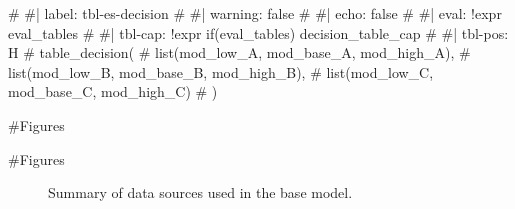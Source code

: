 \documentclass[
]{scrartcl}
\newenvironment{Shaded}{\begin{snugshade}}{\end{snugshade}}
\newcommand{\CommentTok}[1]{\textcolor[rgb]{0.37,0.37,0.37}{#1}}
\begin{document}
\begin{landscape}
\begin{longtable}
\end{longtable}

\endgroup

\end{landscape}

\begin{Shaded}
\begin{Highlighting}[]
\CommentTok{\# \#| label: tbl{-}es{-}decision}
\CommentTok{\# \#| warning: false}
\CommentTok{\# \#| echo: false}
\CommentTok{\# \#| eval: !expr eval\_tables }
\CommentTok{\# \#| tbl{-}cap: !expr if(eval\_tables) decision\_table\_cap }
\CommentTok{\# \#| tbl{-}pos: H}
\CommentTok{\# table\_decision(}
\CommentTok{\#   list(mod\_low\_A, mod\_base\_A, mod\_high\_A),}
\CommentTok{\#   list(mod\_low\_B, mod\_base\_B, mod\_high\_B),}
\CommentTok{\#   list(mod\_low\_C, mod\_base\_C, mod\_high\_C)}
\CommentTok{\# )}
\end{Highlighting}
\end{Shaded}

\pagebreak

\newpage{}

\#Figures

\#Figures

\begin{figure}


\caption{\label{fig-data}Summary of data sources used in the base
model.}

\end{figure}%
\end{document}
